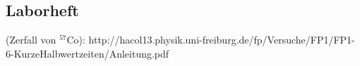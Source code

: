 \documentclass[12pt]{article}
\begin{document}
%

\newpage
\subsection{Laborheft}

\newpage
\listoffigures


\newpage
\thispagestyle{empty}
\begin{thebibliography}{9}

 (Zerfall von $^{57}$Co): http://hacol13.physik.uni-freiburg.de/fp/Versuche/FP1/FP1-6-KurzeHalbwertzeiten/Anleitung.pdf
  



  
  

\end{thebibliography}
\end{document}
